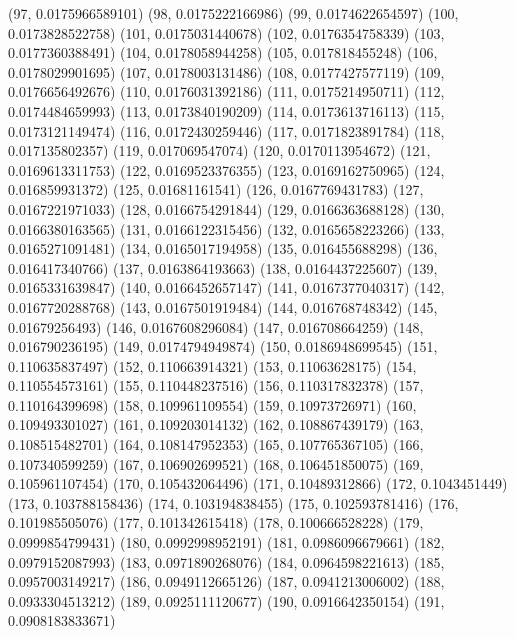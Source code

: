 {					(97, 0.0175966589101)
					(98, 0.0175222166986)
					(99, 0.0174622654597)
					(100, 0.0173828522758)
					(101, 0.0175031440678)
					(102, 0.0176354758339)
					(103, 0.0177360388491)
					(104, 0.0178058944258)
					(105, 0.017818455248)
					(106, 0.0178029901695)
					(107, 0.0178003131486)
					(108, 0.0177427577119)
					(109, 0.0176656492676)
					(110, 0.0176031392186)
					(111, 0.0175214950711)
					(112, 0.0174484659993)
					(113, 0.0173840190209)
					(114, 0.0173613716113)
					(115, 0.0173121149474)
					(116, 0.0172430259446)
					(117, 0.0171823891784)
					(118, 0.017135802357)
					(119, 0.017069547074)
					(120, 0.0170113954672)
					(121, 0.0169613311753)
					(122, 0.0169523376355)
					(123, 0.0169162750965)
					(124, 0.016859931372)
					(125, 0.01681161541)
					(126, 0.0167769431783)
					(127, 0.0167221971033)
					(128, 0.0166754291844)
					(129, 0.0166363688128)
					(130, 0.0166380163565)
					(131, 0.0166122315456)
					(132, 0.0165658223266)
					(133, 0.0165271091481)
					(134, 0.0165017194958)
					(135, 0.016455688298)
					(136, 0.016417340766)
					(137, 0.0163864193663)
					(138, 0.0164437225607)
					(139, 0.0165331639847)
					(140, 0.0166452657147)
					(141, 0.0167377040317)
					(142, 0.0167720288768)
					(143, 0.0167501919484)
					(144, 0.016768748342)
					(145, 0.01679256493)
					(146, 0.0167608296084)
					(147, 0.016708664259)
					(148, 0.016790236195)
					(149, 0.0174794949874)
					(150, 0.0186948699545)
					(151, 0.110635837497)
					(152, 0.110663914321)
					(153, 0.11063628175)
					(154, 0.110554573161)
					(155, 0.110448237516)
					(156, 0.110317832378)
					(157, 0.110164399698)
					(158, 0.109961109554)
					(159, 0.10973726971)
					(160, 0.109493301027)
					(161, 0.109203014132)
					(162, 0.108867439179)
					(163, 0.108515482701)
					(164, 0.108147952353)
					(165, 0.107765367105)
					(166, 0.107340599259)
					(167, 0.106902699521)
					(168, 0.106451850075)
					(169, 0.105961107454)
					(170, 0.105432064496)
					(171, 0.10489312866)
					(172, 0.1043451449)
					(173, 0.103788158436)
					(174, 0.103194838455)
					(175, 0.102593781416)
					(176, 0.101985505076)
					(177, 0.101342615418)
					(178, 0.100666528228)
					(179, 0.0999854799431)
					(180, 0.0992998952191)
					(181, 0.0986096679661)
					(182, 0.0979152087993)
					(183, 0.0971890268076)
					(184, 0.0964598221613)
					(185, 0.0957003149217)
					(186, 0.0949112665126)
					(187, 0.0941213006002)
					(188, 0.0933304513212)
					(189, 0.0925111120677)
					(190, 0.0916642350154)
					(191, 0.0908183833671)
}

